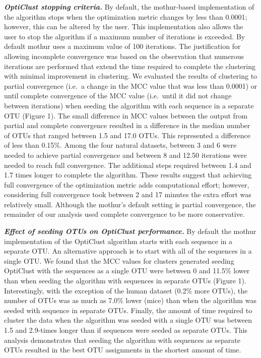 \documentclass[11pt,]{article}
\begin{document}
\textbf{\emph{OptiClust stopping criteria.}} By default, the
mothur-based implementation of the algorithm stops when the optimization
metric changes by less than 0.0001; however, this can be altered by the
user. This implementation also allows the user to stop the algorithm if
a maximum number of iterations is exceeded. By default mothur uses a
maximum value of 100 iterations. The justification for allowing
incomplete convergence was based on the observation that numerous
iterations are performed that extend the time required to complete the
clustering with minimal improvement in clustering. We evaluated the
results of clustering to partial convergence (i.e.~a change in the MCC
value that was less than 0.0001) or until complete convergence of the
MCC value (i.e.~until it did not change between iterations) when seeding
the algorithm with each sequence in a separate OTU (Figure 1). The small
difference in MCC values between the output from partial and complete
convergence resulted in a difference in the median number of OTUs that
ranged between 1.5 and 17.0 OTUs. This represented a difference of less
than 0.15\%. Among the four natural datasets, between 3 and 6 were
needed to achieve partial convergence and between 8 and 12.50 iterations
were needed to reach full convergence. The additional steps required
between 1.4 and 1.7 times longer to complete the algorithm. These
results suggest that achieving full convergence of the optimization
metric adds computational effort; however, considering full convergence
took between 2 and 17 minutes the extra effort was relatively small.
Although the mothur's default setting is partial convergence, the
remainder of our analysis used complete convergence to be more
conservative.

\textbf{\emph{Effect of seeding OTUs on OptiClust performance.}} By
default the mothur implementation of the OptiClust algorithm starts with
each sequence in a separate OTU. An alternative approach is to start
with all of the sequences in a single OTU. We found that the MCC values
for clusters generated seeding OptiClust with the sequences as a single
OTU were between 0 and 11.5\% lower than when seeding the algorithm with
sequences in separate OTUs (Figure 1). Interestingly, with the exception
of the human dataset (0.2\% more OTUs), the number of OTUs was as much
as 7.0\% lower (mice) than when the algorithm was seeded with sequence
in separate OTUs. Finally, the amount of time required to cluster the
data when the algorithm was seeded with a single OTU was between 1.5 and
2.9-times longer than if sequences were seeded as separate OTUs. This
analysis demonstrates that seeding the algorithm with sequences as
separate OTUs resulted in the best OTU assignments in the shortest
amount of time.
\end{document}
